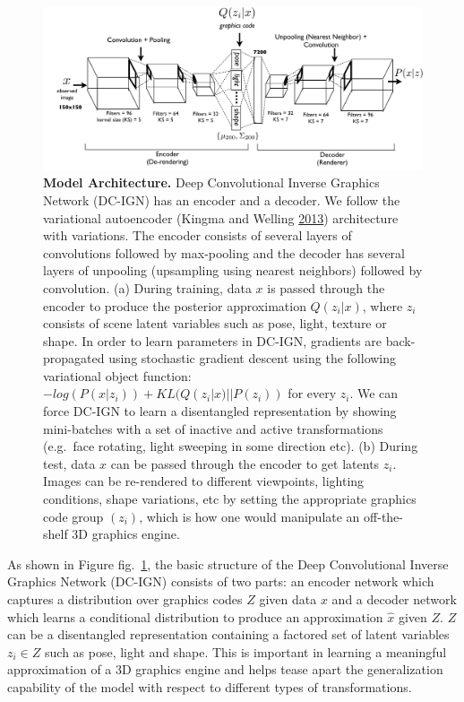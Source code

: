 \documentclass[12pt,twoside]{mitthesis}
\begin{document}
\begin{figure}[htbp]
\centering
\includegraphics{../figures/overview.pdf}
\caption{\label{fig:overview}\textbf{Model Architecture.} Deep
Convolutional Inverse Graphics Network (DC-IGN) has an encoder and a
decoder. We follow the variational autoencoder (Kingma and Welling
\protect\hyperlink{ref-kingma2013auto}{2013}) architecture with
variations. The encoder consists of several layers of convolutions
followed by max-pooling and the decoder has several layers of unpooling
(upsampling using nearest neighbors) followed by convolution. (a) During
training, data \(x\) is passed through the encoder to produce the
posterior approximation \(Q(z_i|x)\), where \(z_i\) consists of scene
latent variables such as pose, light, texture or shape. In order to
learn parameters in DC-IGN, gradients are back-propagated using
stochastic gradient descent using the following variational object
function: \(-log(P(x|z_i)) + KL(Q(z_i|x)||P(z_i))\) for every \(z_i\).
We can force DC-IGN to learn a disentangled representation by showing
mini-batches with a set of inactive and active transformations
(e.g.~face rotating, light sweeping in some direction etc). (b) During
test, data \(x\) can be passed through the encoder to get latents
\(z_i\). Images can be re-rendered to different viewpoints, lighting
conditions, shape variations, etc by setting the appropriate graphics
code group \((z_i)\), which is how one would manipulate an off-the-shelf
3D graphics engine.}
\end{figure}

As shown in Figure fig.~\ref{fig:overview}, the basic structure of the
Deep Convolutional Inverse Graphics Network (DC-IGN) consists of two
parts: an encoder network which captures a distribution over graphics
codes \(Z\) given data \(x\) and a decoder network which learns a
conditional distribution to produce an approximation \(\hat{x}\) given
\(Z\). \(Z\) can be a disentangled representation containing a factored
set of latent variables \(z_i \in Z\) such as pose, light and shape.
This is important in learning a meaningful approximation of a 3D
graphics engine and helps tease apart the generalization capability of
the model with respect to different types of transformations.
\end{document}

